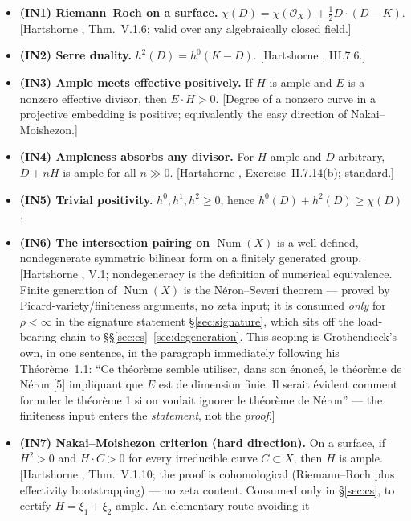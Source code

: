 \documentclass[11pt]{article}
\theoremstyle{definition}
\theoremstyle{remark}
\newcommand{\Num}{\operatorname{Num}}
\newcommand{\OX}{\mathcal{O}_X}
\begin{document}
\begin{itemize}
\item \textbf{(IN1) Riemann--Roch on a surface.}
  $\chi(D) = \chi(\OX) + \tfrac{1}{2} D \cdot (D - K)$.
  [Hartshorne \cite{Hartshorne}, Thm.~V.1.6; valid over any algebraically closed field.]
\item \textbf{(IN2) Serre duality.} $h^2(D) = h^0(K - D)$.
  [Hartshorne \cite{Hartshorne}, III.7.6.]
\item \textbf{(IN3) Ample meets effective positively.} If $H$ is ample and $E$ is a nonzero
  effective divisor, then $E \cdot H > 0$. [Degree of a nonzero curve in a projective
  embedding is positive; equivalently the easy direction of Nakai--Moishezon.]
\item \textbf{(IN4) Ampleness absorbs any divisor.} For $H$ ample and $D$ arbitrary,
  $D + nH$ is ample for all $n \gg 0$. [Hartshorne \cite{Hartshorne}, Exercise~II.7.14(b);
  standard.]
\item \textbf{(IN5) Trivial positivity.} $h^0, h^1, h^2 \ge 0$, hence
  $h^0(D) + h^2(D) \ge \chi(D)$.
\item \textbf{(IN6) The intersection pairing on $\Num(X)$} is a well-defined, nondegenerate
  symmetric bilinear form on a finitely generated group. [Hartshorne \cite{Hartshorne}, V.1;
  nondegeneracy is the definition of numerical equivalence. Finite generation of $\Num(X)$
  is the N\'eron--Severi theorem --- proved by Picard-variety/finiteness arguments, no zeta
  input; it is consumed \emph{only} for $\rho < \infty$ in the signature statement
  \S\ref{sec:signature}, which sits off the load-bearing chain to
  \S\S\ref{sec:cs}--\ref{sec:degeneration}. This scoping is Grothendieck's own, in one
  sentence, in the paragraph immediately following his Th\'eor\`eme~1.1: ``Ce th\'eor\`eme
  semble utiliser, dans son \'enonc\'e, le th\'eor\`eme de N\'eron [5] impliquant que $E$ est
  de dimension finie. Il serait \'evident comment formuler le th\'eor\`eme 1 si on voulait
  ignorer le th\'eor\`eme de N\'eron'' \cite[p.~208]{Grothendieck} --- the finiteness input
  enters the \emph{statement}, not the \emph{proof}.]
\item \textbf{(IN7) Nakai--Moishezon criterion (hard direction).} On a surface, if
  $H^2 > 0$ and $H \cdot C > 0$ for every irreducible curve $C \subset X$, then $H$ is
  ample. [Hartshorne \cite{Hartshorne}, Thm.~V.1.10; the proof is cohomological
  (Riemann--Roch plus effectivity bootstrapping) --- no zeta content. Consumed only in
  \S\ref{sec:cs}, to certify $H = \xi_1 + \xi_2$ ample. An elementary route avoiding it

\end{itemize}
\end{document}
